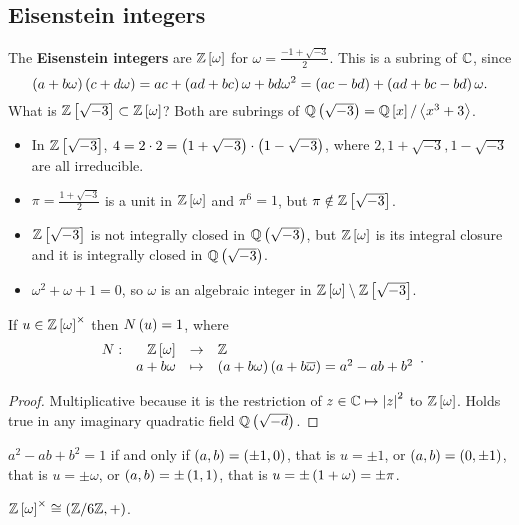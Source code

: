 \pagebreak

\subsection{Eisenstein integers}

The \textbf{Eisenstein integers} are $ \mathbb{Z}\left[ \omega \right] $ for $ \omega = \tfrac{-1 + \sqrt{-3}}{2} $. This is a subring of $ \mathbb{C} $, since
$$ \left( a + b\omega \right)\left( c + d\omega \right) = ac + \left( ad + bc \right)\omega + bd\omega^2 = \left( ac - bd \right) + \left( ad + bc - bd \right)\omega. $$
What is $ \mathbb{Z}\left[ \sqrt{-3} \right] \subset \mathbb{Z}\left[ \omega \right] $? Both are subrings of $ \mathbb{Q}\left( \sqrt{-3} \right) = \mathbb{Q}\left[ x \right] / \left\langle x^3 + 3 \right\rangle $.
\begin{itemize}
\item In $ \mathbb{Z}\left[ \sqrt{-3} \right] $, $ 4 = 2 \cdot 2 = \left( 1 + \sqrt{-3} \right) \cdot \left( 1 - \sqrt{-3} \right) $, where $ 2, 1 + \sqrt{-3}, 1 - \sqrt{-3} $ are all irreducible.
\item $ \pi = \tfrac{1 + \sqrt{-3}}{2} $ is a unit in $ \mathbb{Z}\left[ \omega \right] $ and $ \pi^6 = 1 $, but $ \pi \notin \mathbb{Z}\left[ \sqrt{-3} \right] $.
\item $ \mathbb{Z}\left[ \sqrt{-3} \right] $ is not integrally closed in $ \mathbb{Q}\left( \sqrt{-3} \right) $, but $ \mathbb{Z}\left[ \omega \right] $ is its integral closure and it is integrally closed in $ \mathbb{Q}\left( \sqrt{-3} \right) $.
\item $ \omega^2 + \omega + 1 = 0 $, so $ \omega $ is an algebraic integer in $ \mathbb{Z}\left[ \omega \right] \setminus \mathbb{Z}\left[ \sqrt{-3} \right] $.
\end{itemize}

\begin{proposition}
If $ u \in \mathbb{Z}\left[ \omega \right]^\times $ then $ N\left( u \right) = 1 $, where
$$ \function[N]{\Z\sb{\omega}}{\Z}{a + b\omega}{\rb{a + b\omega}\rb{a + b\overline{\omega}} = a^2 - ab + b^2}. $$
\end{proposition}

\begin{proof}
Multiplicative because it is the restriction of $ z \in \mathbb{C} \mapsto \left\lvert z \right\rvert^2 $ to $ \mathbb{Z}\left[ \omega \right] $. Holds true in any imaginary quadratic field $ \mathbb{Q}\left( \sqrt{-d} \right) $.
\end{proof}

$ a^2 - ab + b^2 = 1 $ if and only if $ \left( a, b \right) = \left( \pm 1, 0 \right) $, that is $ u = \pm 1 $, or $ \left( a, b \right) = \left( 0, \pm 1 \right) $, that is $ u = \pm\omega $, or $ \left( a, b \right) = \pm\left( 1, 1 \right) $, that is $ u = \pm\left( 1 + \omega \right) = \pm\pi $.

\begin{remark*}
$ \mathbb{Z}\left[ \omega \right]^\times \cong \left( \mathbb{Z} / 6\mathbb{Z}, + \right) $.
\end{remark*}

